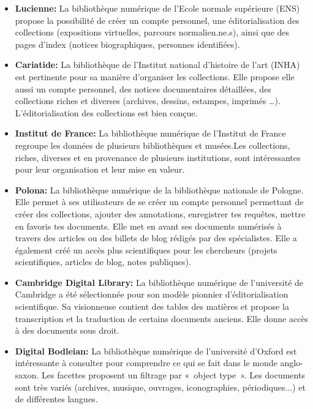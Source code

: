 \begin{itemize}
\begin{itemize}
\item \textbf{Lucienne:} La bibliothèque numérique de l'Ecole normale supérieure (ENS) propose la possibilité de créer un compte personnel, une éditorialisation des collections (expositions virtuelles, parcours normalien.ne.s), ainsi que des pages d'index (notices biographiques, personnes identifiées).
\item \textbf{Cariatide:} La bibliothèque de l’Institut national d'histoire de l'art (INHA) est pertinente pour sa manière d’organiser les collections. Elle propose elle aussi un compte personnel, des notices documentaires détaillées, des collections riches et diverses (archives, dessins, estampes, imprimés …).  L'éditorialisation des collections est bien conçue. 
\item \textbf{Institut de France:} La bibliothèque numérique de l'Institut de France regroupe les données de plusieurs bibliothèques et musées.Les collections, riches, diverses et en provenance de plusieurs institutions, sont intéressantes pour leur organisation et leur mise en valeur. 
\item \textbf{Polona:} La bibliothèque numérique de la bibliothèque nationale de Pologne. Elle permet à ses utilisateurs de se créer un compte personnel permettant de créer des collections, ajouter des annotations, enregistrer tes requêtes, mettre en favoris tes documents. Elle met en avant ses documents numérisés à travers des articles ou des billets de blog rédigés par des spécialistes. Elle a également créé un accès plus scientifiques pour les chercheurs (projets scientifiques, articles de blog, notes publiques).
\item \textbf{Cambridge Digital Library:} La bibliothèque numérique de l’université de Cambridge a été sélectionnée pour son modèle pionnier d'éditorialisation scientifique. Sa visionneuse contient des tables des matières et propose la transcription et la traduction de certains documents anciens.  Elle donne accès à des documents sous droit.
\item \textbf{Digital Bodleian:} La bibliothèque numérique de l'université d'Oxford est intéressante à consulter pour comprendre ce qui se fait dans le monde anglo-saxon. Les facettes proposent un filtrage par « object type ». Les documents sont très variés (archives, musique, ouvrages, iconographies, périodiques...)  et de différentes langues.
\end{itemize}
\end{itemize}

